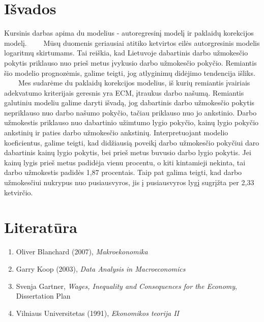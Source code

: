 \documentclass[12pt,a4paper]{article}
\theoremstyle{change}\newtheorem{salyga}{Uždavinys}
\begin{document}
\section{Išvados}
\hspace{40pt}   
Kursinis darbas apima du modelius - autoregresinį modelį ir paklaidų korekcijos modelį. 
\vskip 8pt
$\qquad$Mūsų duomenis geriausiai atitiko ketvirtos eilės autorgresinis modelis logaritmų skirtumams. Tai reiškia, kad Lietuvoje dabartinis darbo užmokesčio pokytis priklauso nuo prieš metus įvykusio darbo užmokesčio pokyčio. Remiantis šio modelio prognozėmis, galime teigti, jog atlyginimų didėjimo tendencija išliks. 
\vskip 8pt
$\qquad$Mes sudarėme du paklaidų korekcijos modelius, iš kurių remiantis įvairiais adekvatumo kriterijais geresnis yra ECM, įtraukus darbo našumą. Remiantis galutiniu modeliu galime daryti išvadą, jog dabartinis darbo užmokesčio pokytis nepriklauso nuo darbo našumo pokyčio, tačiau priklauso nuo jo ankstinio. Darbo užmokestis priklauso nuo dabartinio užimtumo lygio pokyčio, kainų lygio pokyčio ankstinių ir paties darbo užmokesčio ankstinių. Interpretuojant modelio koeficientus, galime teigti, kad didžiausią poveikį darbo užmokesčio pokyčiui daro dabartinis kainų lygio pokytis, bei prieš metus buvusio darbo lygio pokytis. Jei kainų lygis prieš metus padidėja vienu procentu, o kiti kintamieji nekinta, tai darbo užmokestis padidės 1,87 procentais. Taip pat galima teigti, kad darbo užmokesčiui nukrypus nuo pusiausvyros, jis į pusiausvyros lygį sugrįžta per 2,33 ketvirčio. 




\pagebreak     
\section{Literatūra}  

\begin{enumerate}
\item Oliver Blanchard (2007), \textit{Makroekonomika }   
\item Garry Koop (2003), \textit{Data Analysis in Macroeconomics }
\item Svenja Gartner, \textit{ Wages, Inequality and Consequences for the Economy}, Dissertation Plan
\item Vilniaus Universitetas (1991), \textit{Ekonomikos teorija II}
\end{enumerate}





\pagebreak     
\end{document}
